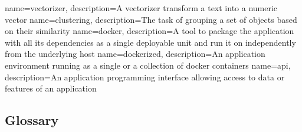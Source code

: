 
\renewcommand{\glossarysection}[2][]{}

{
    name=vectorizer,
    description={A vectorizer transform a text into a numeric vector}
}
{
    name=clustering,
    description={The task of grouping a set of objects based on their similarity}
}
{
    name=docker,
    description={A tool to package the application with all its dependencies as a single deployable unit and run it on independently from the underlying host}
}
{
    name=dockerized,
    description={An application environment running as a single or a collection of docker containers}
}
{
    name=api,
    description={An application programming interface allowing access to data or features of an application}
}

\glsaddall
\subsection{Glossary}
\printglossaries
